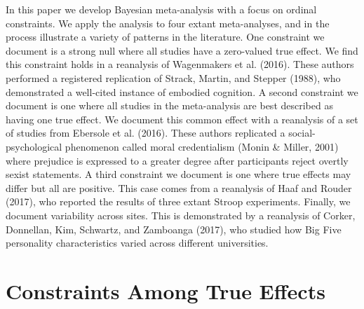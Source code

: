 \documentclass[english,man]{apa6}
\theoremstyle{definition}
\theoremstyle{definition}
\theoremstyle{definition}
\theoremstyle{remark}
\begin{document}
In this paper we develop Bayesian meta-analysis with a focus on ordinal
constraints. We apply the analysis to four extant meta-analyses, and in
the process illustrate a variety of patterns in the literature. One
constraint we document is a strong null where all studies have a
zero-valued true effect. We find this constraint holds in a reanalysis
of Wagenmakers et al. (2016). These authors performed a registered
replication of Strack, Martin, and Stepper (1988), who demonstrated a
well-cited instance of embodied cognition. A second constraint we
document is one where all studies in the meta-analysis are best
described as having one true effect. We document this common effect with
a reanalysis of a set of studies from Ebersole et al. (2016). These
authors replicated a social-psychological phenomenon called moral
credentialism (Monin \& Miller, 2001) where prejudice is expressed to a
greater degree after participants reject overtly sexist statements. A
third constraint we document is one where true effects may differ but
all are positive. This case comes from a reanalysis of Haaf and Rouder
(2017), who reported the results of three extant Stroop experiments.
Finally, we document variability across sites. This is demonstrated by a
reanalysis of Corker, Donnellan, Kim, Schwartz, and Zamboanga (2017),
who studied how Big Five personality characteristics varied across
different universities.

\section{Constraints Among True
Effects}\label{constraints-among-true-effects}
\end{document}
